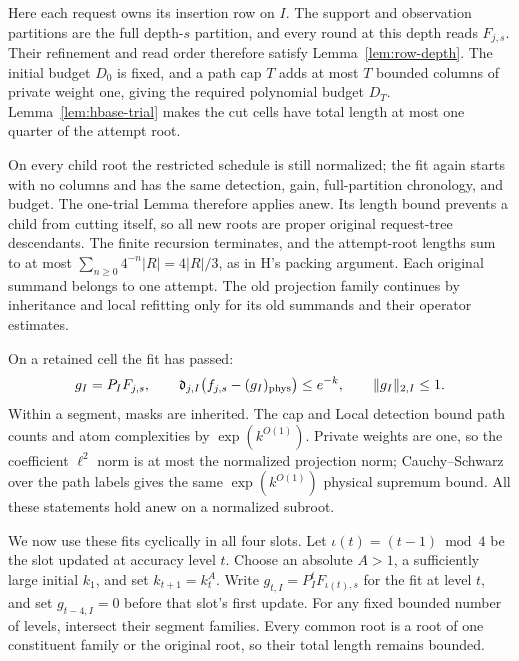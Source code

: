 Here each request owns its insertion row on \(I\).  The support and
observation partitions are the full depth-\(s\) partition, and every
round at this depth reads \(F_{j,s}\).  Their refinement and read
order therefore satisfy Lemma~\ref{lem:row-depth}.  The initial
budget \(D_0\) is fixed, and a path cap \(T\) adds at most \(T\)
bounded columns of private weight one, giving the required polynomial
budget \(D_T\).  Lemma~\ref{lem:hbase-trial} makes the cut cells have
total length at most one quarter of the attempt root.

On every child root the restricted schedule is still normalized;
the fit again starts with no columns and has the same detection,
gain, full-partition chronology, and budget.  The one-trial Lemma
therefore applies anew.  Its length bound prevents a child from
cutting itself, so all new roots are proper original request-tree
descendants.  The finite recursion terminates, and the attempt-root
lengths sum to at most
\(\sum_{n\ge0}4^{-n}|R|=4|R|/3\), as in H's packing argument.
Each original summand belongs to one attempt.  The old projection
family continues by inheritance and local refitting only for its
old summands and their operator estimates.

On a retained cell the fit has passed:
\[
 g_I=P_IF_{j,s},\qquad
 \mathfrak d_{j,I}\bigl(f_{j,s}-(g_I)_{\rm phys}\bigr)\le e^{-k},
 \qquad \|g_I\|_{2,I}\le1.
\]
Within a segment, masks are inherited.  The cap and Local detection
bound path counts and atom complexities by \(\exp(k^{O(1)})\).
Private weights are one, so the coefficient \(\ell^2\) norm is at
most the normalized projection norm; Cauchy--Schwarz over the path
labels gives the same \(\exp(k^{O(1)})\) physical supremum bound.
All these statements hold anew on a normalized subroot.

We now use these fits cyclically in all four slots.  Let
\(\iota(t)=(t-1)\bmod4\) be the slot updated at accuracy level \(t\).
Choose an absolute \(A>1\), a sufficiently large initial \(k_1\),
and set \(k_{t+1}=k_t^A\).  Write \(g_{t,I}=P^t_IF_{\iota(t),s}\)
for the fit at level \(t\), and set \(g_{t-4,I}=0\) before that
slot's first update.  For any fixed bounded number of levels,
intersect their segment families.  Every common root is a root of
one constituent family or the original root, so their total length
remains bounded.

